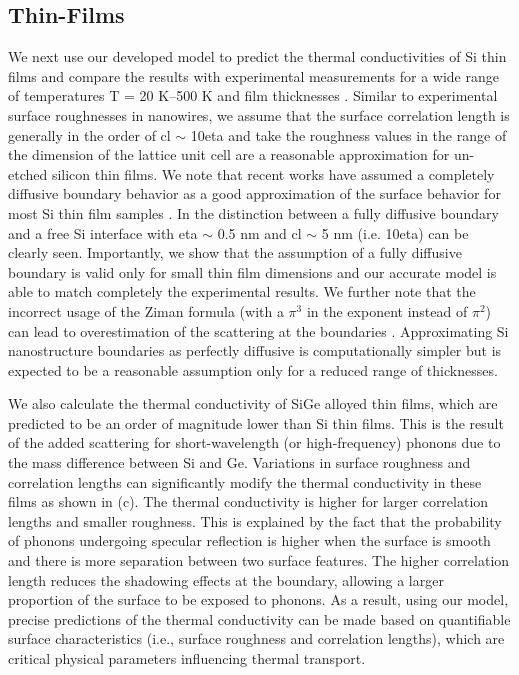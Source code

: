 \subsection{Thin-Films}
We next use our developed model to predict the thermal conductivities of Si thin films and compare the results with experimental measurements for a wide range of temperatures \gls{T} = 20 K–500 K and film thicknesses \cite{RN217,RN127,RN126,RN128,RN124,RN227,RN274,RN189,RN125}. Similar to experimental surface roughnesses in nanowires, we assume that the surface correlation length is generally in the order of \gls{cl} $\sim$ 10\gls{eta} and take the roughness values in the range of the dimension of the lattice unit cell are a reasonable approximation for un-etched silicon thin films. We note that recent works have assumed a completely diffusive boundary behavior as a good approximation of the surface behavior for most Si thin film samples \cite{RN208,RN217}. In  the distinction between a fully diffusive boundary and a free Si interface with \gls{eta} $\sim$ 0.5 nm and \gls{cl} $\sim$ 5 nm (i.e. 10\gls{eta}) can be clearly seen. Importantly, we show that the assumption of a fully diffusive boundary is valid only for small thin film dimensions and our accurate model is able to match completely the experimental results. We further note that the incorrect usage of the Ziman formula (with a $\pi^3$ in the exponent instead of $\pi^2$) can lead to overestimation of the scattering at the boundaries \cite{RN208}. Approximating Si nanostructure boundaries as perfectly diffusive is computationally simpler but is expected to be a reasonable assumption only for a reduced range of thicknesses. 
\par We also calculate the thermal conductivity of SiGe alloyed thin films, which are predicted to be an order of magnitude lower than Si thin films. This is the result of the added scattering for short-wavelength (or high-frequency) phonons due to the mass difference between Si and Ge. Variations in surface roughness and correlation lengths can significantly modify the thermal conductivity in these films as shown in (c). The thermal conductivity is higher for larger correlation lengths and smaller roughness. This is explained by the fact that the probability of phonons undergoing specular reflection is higher when the surface is smooth and there is more separation between two surface features. The higher correlation length reduces the shadowing effects at the boundary, allowing a larger proportion of the surface to be exposed to phonons. As a result, using our model, precise predictions of the thermal conductivity can be made based on quantifiable surface characteristics (i.e., surface roughness and correlation lengths), which are critical physical parameters influencing thermal transport. 
